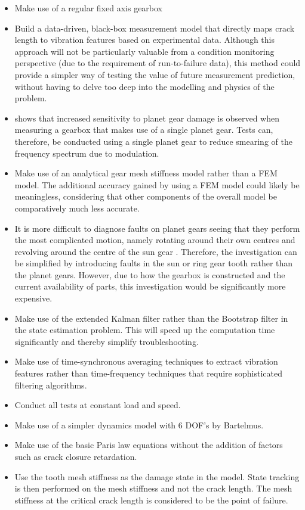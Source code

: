\begin{itemize}
	\item Make use of a regular fixed axis gearbox
	\item Build a data-driven, black-box measurement model that directly maps crack length to vibration features based on experimental data. Although this approach will not be particularly valuable from a condition monitoring perspective (due to the requirement of run-to-failure data), this method could provide a simpler way of testing the value of future measurement prediction, without having to delve too deep into the modelling and physics of the problem.  
	\item \cite{Smidt2009} shows that increased sensitivity to planet gear damage is observed when measuring a gearbox that makes use of a single planet gear. Tests can, therefore, be conducted using a single planet gear to reduce smearing of the frequency spectrum due to modulation.
	\item Make use of an analytical gear mesh stiffness model rather than a FEM model. The additional accuracy gained by using a FEM model could likely be meaningless, considering that other components of the overall model be comparatively much less accurate.
	\item  It is more difficult to diagnose faults on planet gears seeing that they perform the most complicated motion, namely rotating around their own centres and revolving around the centre of the sun gear \citep{Lei2014}. Therefore, the investigation can be simplified by introducing faults in the sun or ring gear tooth rather than the planet gears. However, due to how the gearbox is constructed and the current availability of parts, this investigation would be significantly more expensive. 
	\item Make use of the extended Kalman filter rather than the Bootstrap filter in the state estimation problem. This will speed up the computation time significantly and thereby simplify troubleshooting.  
	\item Make use of time-synchronous averaging techniques to extract vibration features rather than time-frequency techniques that require sophisticated filtering algorithms. 
	\item Conduct all tests at constant load and speed.
	\item Make use of a simpler dynamics model with 6 DOF's by Bartelmus. 
	\item Make use of the basic Paris law equations without the addition of factors such as crack closure retardation. 
	\item Use the tooth mesh stiffness as the damage state in the model. State tracking is then performed on the mesh stiffness and not the crack length. The mesh stiffness at the critical crack length is considered to be the point of failure.
\end{itemize}


